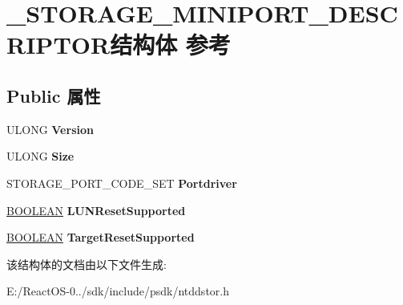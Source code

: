 \hypertarget{struct___s_t_o_r_a_g_e___m_i_n_i_p_o_r_t___d_e_s_c_r_i_p_t_o_r}{}\section{\+\_\+\+S\+T\+O\+R\+A\+G\+E\+\_\+\+M\+I\+N\+I\+P\+O\+R\+T\+\_\+\+D\+E\+S\+C\+R\+I\+P\+T\+O\+R结构体 参考}
\label{struct___s_t_o_r_a_g_e___m_i_n_i_p_o_r_t___d_e_s_c_r_i_p_t_o_r}
\subsection*{Public 属性}
\begin{DoxyCompactItemize}
\item 
\mbox{\label{struct___s_t_o_r_a_g_e___m_i_n_i_p_o_r_t___d_e_s_c_r_i_p_t_o_r_a2118a91e4c5b92504e574700c91e1e53}} 
U\+L\+O\+NG {\bfseries Version}
\item 
\mbox{\label{struct___s_t_o_r_a_g_e___m_i_n_i_p_o_r_t___d_e_s_c_r_i_p_t_o_r_a6e20da1b5acbdacbda763d618d5c40a2}} 
U\+L\+O\+NG {\bfseries Size}
\item 
\mbox{\label{struct___s_t_o_r_a_g_e___m_i_n_i_p_o_r_t___d_e_s_c_r_i_p_t_o_r_adcdff24e94884a42bbec9dbfee13801f}} 
S\+T\+O\+R\+A\+G\+E\+\_\+\+P\+O\+R\+T\+\_\+\+C\+O\+D\+E\+\_\+\+S\+ET {\bfseries Portdriver}
\item 
\mbox{\label{struct___s_t_o_r_a_g_e___m_i_n_i_p_o_r_t___d_e_s_c_r_i_p_t_o_r_a0f11feaa3cd910c4ea05e70d0a19a884}} 
\hyperlink{_processor_bind_8h_a112e3146cb38b6ee95e64d85842e380a}{B\+O\+O\+L\+E\+AN} {\bfseries L\+U\+N\+Reset\+Supported}
\item 
\mbox{\label{struct___s_t_o_r_a_g_e___m_i_n_i_p_o_r_t___d_e_s_c_r_i_p_t_o_r_a7a4a748978457fbb4fce897b527b2f3c}} 
\hyperlink{_processor_bind_8h_a112e3146cb38b6ee95e64d85842e380a}{B\+O\+O\+L\+E\+AN} {\bfseries Target\+Reset\+Supported}
\end{DoxyCompactItemize}


该结构体的文档由以下文件生成\+:\begin{DoxyCompactItemize}
\item 
E\+:/\+React\+O\+S-\/0../sdk/include/psdk/ntddstor.\+h\end{DoxyCompactItemize}
